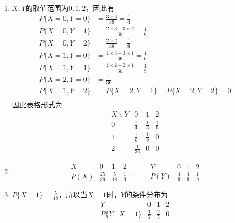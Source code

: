 \begin{solution}
    \begin{enumerate}[(1)]
        \item $X,Y$的取值范围为$0,1,2$，因此有
              \begin{align*}
                  P\{ X=0, Y=0 \} & = \frac{3\times 3}{36} = \frac{1}{4}             \\
                  P\{ X=0, Y=1 \} & = \frac{2\times 3 + 3\times 2}{36} = \frac{1}{6} \\
                  P\{ X=0, Y=2 \} & = \frac{2\times 2}{36} = \frac{1}{9}             \\
                  P\{ X=1, Y=0 \} & = \frac{1\times 3 + 3\times 1}{36} = \frac{1}{6} \\
                  P\{ X=1, Y=1 \} & = \frac{1\times 2 + 2\times 1}{36} = \frac{1}{9} \\
                  P\{ X=2, Y=0 \} & = \frac{1}{36}                                   \\
                  P\{ X=1, Y=2 \} & = P\{ X=2, Y=1 \} = P\{ X=2, Y=2 \} =  0         \\
              \end{align*}
              因此表格形式为
              \[
                  \begin{array}{c|ccc}
                      X\backslash Y & 0            & 1           & 2           \\ \hline
                      0             & \frac{1}{4}  & \frac{1}{3} & \frac{1}{9} \\
                      1             & \frac{1}{6}  & \frac{1}{9} & 0           \\
                      2             & \frac{1}{36} & 0           & 0
                  \end{array}
              \]
        \item
              \[
                  \begin{array}{c|ccc}
                      X    & 0             & 1            & 2           \\\hline
                      P(X) & \frac{25}{36} & \frac{5}{18} & \frac{1}{3}
                  \end{array}
                  ,\qquad
                  \begin{array}{c|ccc}
                      Y    & 0           & 1           & 2           \\\hline
                      P(Y) & \frac{4}{9} & \frac{4}{9} & \frac{1}{9}
                  \end{array}
              \]
        \item $P\{X=1\} = \frac{5}{18}$，所以当$X=1$时，$Y$的条件分布为
              \[
                  \begin{array}{c|ccc}
                      Y              & 0           & 1           & 2 \\\hline
                      P\{Y\mid X=1\} & \frac{3}{5} & \frac{2}{5} & 0
                  \end{array}
              \]
    \end{enumerate}
\end{solution}

